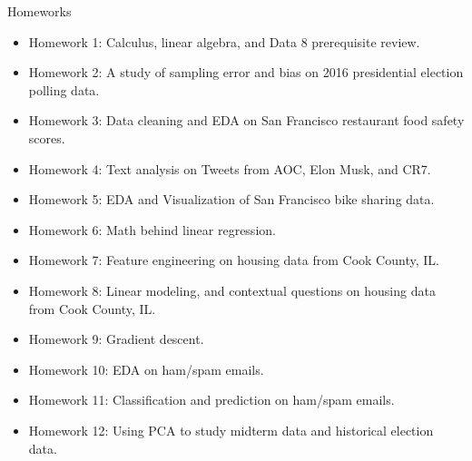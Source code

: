 \documentclass[aspectratio=169]{../latex_main/tntbeamer}  %
\begin{document}
	
	\begin{frame}{Homeworks}
	    \begin{itemize}
	        \item Homework 1: Calculus, linear algebra, and Data 8 prerequisite review.
	        \item Homework 2: A study of sampling error and bias on 2016 presidential election polling data.
	        \item Homework 3: Data cleaning and EDA on San Francisco restaurant food safety scores.
	        \item Homework 4: Text analysis on Tweets from AOC, Elon Musk, and CR7.
	        \item Homework 5: EDA and Visualization of San Francisco bike sharing data.
	        \item Homework 6: Math behind linear regression.
	        \item Homework 7: Feature engineering on housing data from Cook County, IL.
	        \item Homework 8: Linear modeling, and contextual questions on housing data from Cook County, IL.
	        \item Homework 9: Gradient descent.
	        \item Homework 10: EDA on ham/spam emails. 
	        \item Homework 11: Classification and prediction on ham/spam emails. 
	        \item Homework 12: Using PCA to study midterm data and historical election data.
	    \end{itemize}
	\end{frame}
	
\end{document}
